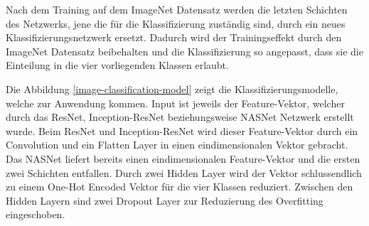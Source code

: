 Nach dem Training auf dem ImageNet Datensatz werden die letzten Schichten des Netzwerks, jene die für die Klassifizierung zuständig sind, durch ein neues Klassifizierungsnetzwerk ersetzt. Dadurch wird der Trainingseffekt durch den ImageNet Datensatz beibehalten und die Klassifizierung so angepasst, dass sie die Einteilung in die vier vorliegenden Klassen erlaubt.

Die Abbildung \ref{image-classification-model} zeigt die Klassifizierungsmodelle, welche zur Anwendung kommen. Input ist jeweils der Feature-Vektor, welcher durch das ResNet, Inception-ResNet beziehungsweise NASNet Netzwerk erstellt wurde. Beim ResNet und Inception-ResNet wird dieser Feature-Vektor durch ein Convolution und ein Flatten Layer in einen eindimensionalen Vektor gebracht. Das NASNet liefert bereits einen eindimensionalen Feature-Vektor und die ersten zwei Schichten entfallen. Durch zwei Hidden Layer wird der Vektor schlussendlich zu einem One-Hot Encoded Vektor für die vier Klassen reduziert. Zwischen den Hidden Layern sind zwei Dropout Layer zur Reduzierung des Overfitting eingeschoben.


